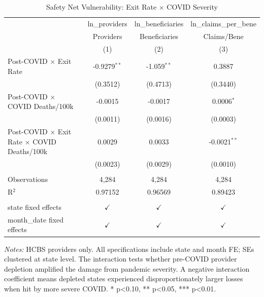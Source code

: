 
\begin{table}[htbp]
   \caption{\label{tab:vulnerability} Safety Net Vulnerability: Exit Rate $\times$ COVID Severity}
   \bigskip
   \centering
   \begin{tabular}{lccc}
      \toprule
                                                                 & ln\_providers  & ln\_beneficiaries  & ln\_claims\_per\_bene\\     
                                                                 & Providers      & Beneficiaries      & Claims/Bene \\   
                                                                 & (1)            & (2)                & (3)\\  
      \midrule 
      Post-COVID $\times$ Exit Rate                              & -0.9279$^{**}$ & -1.059$^{**}$      & 0.3887\\   
                                                                 & (0.3512)       & (0.4713)           & (0.3440)\\   
      Post-COVID $\times$ COVID Deaths/100k                      & -0.0015        & -0.0017            & 0.0006$^{*}$\\   
                                                                 & (0.0011)       & (0.0016)           & (0.0003)\\   
      Post-COVID $\times$ Exit Rate $\times$ COVID Deaths/100k   & 0.0029         & 0.0033             & -0.0021$^{**}$\\   
                                                                 & (0.0023)       & (0.0029)           & (0.0010)\\   
       \\
      Observations                                               & 4,284          & 4,284              & 4,284\\  
      R$^2$                                                      & 0.97152        & 0.96569            & 0.89423\\  
       \\
      state fixed effects                                        & $\checkmark$   & $\checkmark$       & $\checkmark$\\   
      month\_date fixed effects                                  & $\checkmark$   & $\checkmark$       & $\checkmark$\\   
      \bottomrule
   \end{tabular}
   
   \par \raggedright 
   \textit{Notes:} HCBS providers only. All specifications include state and month FE; SEs clustered at state level. The interaction tests whether pre-COVID provider depletion amplified the damage from pandemic severity. A negative interaction coefficient means depleted states experienced disproportionately larger losses when hit by more severe COVID. * p<0.10, ** p<0.05, *** p<0.01.
\end{table}


